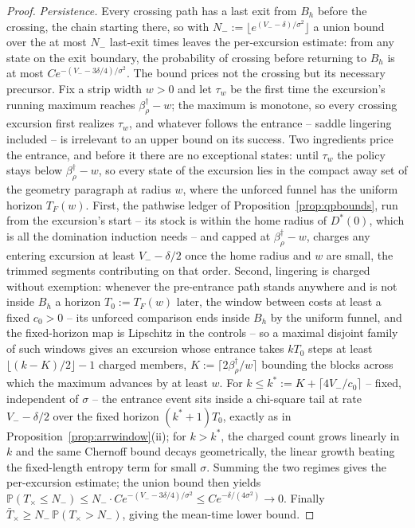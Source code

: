 \documentclass[11pt]{article}
\theoremstyle{definition}
\theoremstyle{remark}
\numberwithin{equation}{section}
\begin{document}
\begin{proof}
\emph{Persistence.} Every crossing path has a last exit from $B_h$ before the crossing, the chain starting there, so with $N_- := \lfloor e^{(V_- - \delta)/\sigma^2}\rfloor$ a union bound over the at most $N_-$ last-exit times leaves the per-excursion estimate: from any state on the exit boundary, the probability of crossing before returning to $B_h$ is at most $C e^{-(V_- - 3\delta/4)/\sigma^2}$. The bound prices not the crossing but its necessary precursor. Fix a strip width $w > 0$ and let $\tau_w$ be the first time the excursion's running maximum reaches $\beta^\dagger_\rho - w$; the maximum is monotone, so every crossing excursion first realizes $\tau_w$, and whatever follows the entrance -- saddle lingering included -- is irrelevant to an upper bound on its success. Two ingredients price the entrance, and before it there are no exceptional states: until $\tau_w$ the policy stays below $\beta^\dagger_\rho - w$, so every state of the excursion lies in the compact away set of the geometry paragraph at radius $w$, where the unforced funnel has the uniform horizon $T_F(w)$. First, the pathwise ledger of Proposition~\ref{prop:qpbounds}, run from the excursion's start -- its stock is within the home radius of $D^\ast(0)$, which is all the domination induction needs -- and capped at $\beta^\dagger_\rho - w$, charges any entering excursion at least $V_- - \delta/2$ once the home radius and $w$ are small, the trimmed segments contributing on that order. Second, lingering is charged without exemption: whenever the pre-entrance path stands anywhere and is not inside $B_h$ a horizon $T_0 := T_F(w)$ later, the window between costs at least a fixed $c_0 > 0$ -- its unforced comparison ends inside $B_h$ by the uniform funnel, and the fixed-horizon map is Lipschitz in the controls -- so a maximal disjoint family of such windows gives an excursion whose entrance takes $kT_0$ steps at least $\lfloor (k - K)/2 \rfloor - 1$ charged members, $K := \lceil 2\beta^\dagger_\rho/w \rceil$ bounding the blocks across which the maximum advances by at least $w$. For $k \le k^\ast := K + \lceil 4V_-/c_0 \rceil$ -- fixed, independent of $\sigma$ -- the entrance event sits inside a chi-square tail at rate $V_- - \delta/2$ over the fixed horizon $(k^\ast{+}1)T_0$, exactly as in Proposition~\ref{prop:arrwindow}(ii); for $k > k^\ast$, the charged count grows linearly in $k$ and the same Chernoff bound decays geometrically, the linear growth beating the fixed-length entropy term for small $\sigma$. Summing the two regimes gives the per-excursion estimate; the union bound then yields $\mathbb{P}(T_{\times} \le N_-) \le N_- \cdot C e^{-(V_- - 3\delta/4)/\sigma^2} \le C e^{-\delta/(4\sigma^2)} \to 0$. Finally $\bar T_{\times} \ge N_- \,\mathbb{P}(T_{\times} > N_-)$, giving the mean-time lower bound.
\end{proof}
\end{document}
